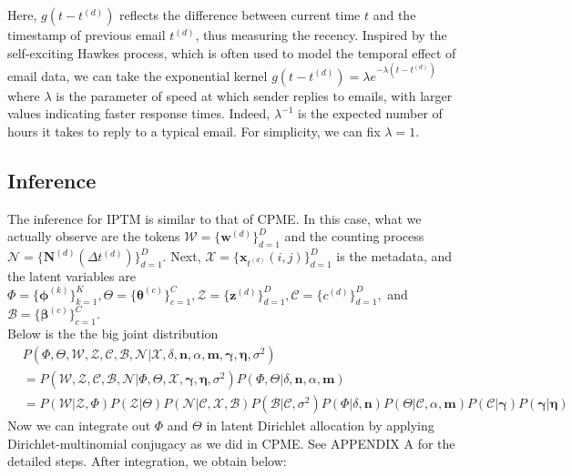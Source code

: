 \documentclass[a4paper]{article}
\begin{document}
Here, $g(t-t^{(d)})$ reflects the difference between current time $t$ and the timestamp of previous email $t^{(d)}$, thus measuring the recency. Inspired by the self-exciting Hawkes process, which is often used to model the temporal effect of email data, we can take the exponential kernel $g(t-t^{(d)})=\lambda e^{-\lambda(t-t^{(d)})}$ where $\lambda$ is the parameter of speed at
which sender replies to emails, with larger values indicating faster response times. Indeed, $\lambda^{-1}$ is the expected number of hours it takes to reply to a typical email. For simplicity, we can fix $\lambda=1$.
\subsection{Inference}
The inference for IPTM is similar to that of CPME. In this case, what we actually observe are the  tokens $\mathcal{W}=\{\boldsymbol{w}^{(d)} \}_{d=1}^{D}$ and the counting process $\mathcal{N}=\{\boldsymbol{N}^{(d)}(\Delta t^{(d)}) \}_{d=1}^{D}.$ Next,  $\mathcal{X}=\{\boldsymbol{x}_{t^{(d)}}(i, j)\}_{d=1}^{D}$ is the metadata, and the latent variables are $\Phi=\{\boldsymbol{\phi}^{(k)}\}_{k=1}^{K}, \Theta=\{\boldsymbol{\theta}^{(c)} \}_{c=1}^{C}, \mathcal{Z}=\{\boldsymbol{z}^{(d)} \}_{d=1}^{D}, \mathcal{C}=\{{c}^{(d)} \}_{d=1}^{D},$ and $\mathcal{B}=\{\boldsymbol{\beta}^{(c)} \}_{c=1}^{C}$.\\
\newline 
Below is the the big joint distribution
\begin{equation}
\begin{aligned}
& P(\Phi, \Theta, \mathcal{W}, \mathcal{Z}, \mathcal{C}, \mathcal{B}, \mathcal{N}| \mathcal{X}, \delta, \boldsymbol{n}, \alpha, \boldsymbol{m}, \boldsymbol{\gamma}, \boldsymbol{\eta}, \sigma^2) \\& 
=  P(\mathcal{W}, \mathcal{Z}, \mathcal{C}, \mathcal{B}, \mathcal{N}| \Phi, \Theta, \mathcal{X}, \boldsymbol{\gamma}, \boldsymbol{\eta}, \sigma^2) P(\Phi, \Theta |\delta, \boldsymbol{n}, \alpha, \boldsymbol{m})
\\&= P( \mathcal{W}| \mathcal{Z}, \Phi)P(\mathcal{Z}|\Theta)P(\mathcal{N}|\mathcal{C}, \mathcal{X}, \mathcal{B})P(\mathcal{B}|\mathcal{C}, \sigma^2)P(\Phi|\delta, \boldsymbol{n})P(\Theta|\mathcal{C}, \alpha, \boldsymbol{m})P(\mathcal{C}|\boldsymbol{\gamma})P(\boldsymbol{\gamma}|\boldsymbol{\eta})
\end{aligned}
\end{equation}
Now we can integrate out $\Phi$ and $\Theta$ in latent Dirichlet allocation by applying Dirichlet-multinomial conjugacy as we did in CPME. See APPENDIX A for the detailed steps. After integration, we obtain below:
\end{document}
